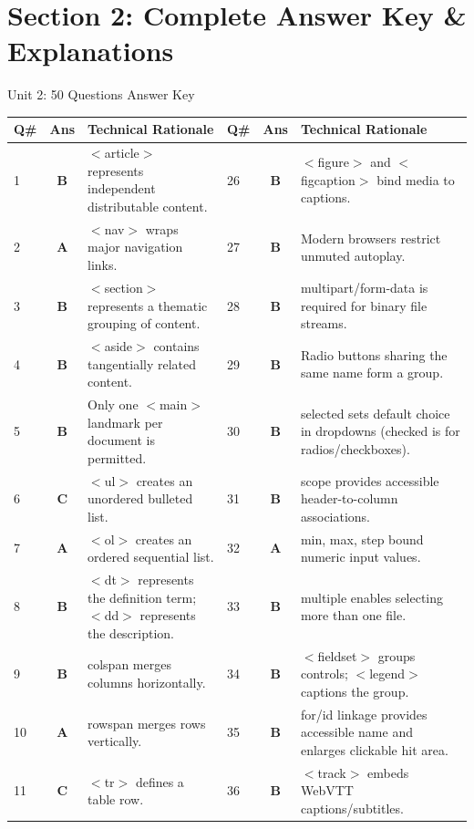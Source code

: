 \newpage
\section{Section 2: Complete Answer Key \& Explanations}

\begin{answerkeytable}{Unit 2: 50 Questions Answer Key}
\begin{tabularx}{\textwidth}{l c X l c X}
\toprule
\textbf{Q\#} & \textbf{Ans} & \textbf{Technical Rationale} & \textbf{Q\#} & \textbf{Ans} & \textbf{Technical Rationale} \\
\midrule
1 & \textbf{B} & $<$article$>$ represents independent distributable content. & 26 & \textbf{B} & $<$figure$>$ and $<$figcaption$>$ bind media to captions. \\
2 & \textbf{A} & $<$nav$>$ wraps major navigation links. & 27 & \textbf{B} & Modern browsers restrict unmuted autoplay. \\
3 & \textbf{B} & $<$section$>$ represents a thematic grouping of content. & 28 & \textbf{B} & multipart/form-data is required for binary file streams. \\
4 & \textbf{B} & $<$aside$>$ contains tangentially related content. & 29 & \textbf{B} & Radio buttons sharing the same name form a group. \\
5 & \textbf{B} & Only one $<$main$>$ landmark per document is permitted. & 30 & \textbf{B} & selected sets default choice in dropdowns (checked is for radios/checkboxes). \\
6 & \textbf{C} & $<$ul$>$ creates an unordered bulleted list. & 31 & \textbf{B} & scope provides accessible header-to-column associations. \\
7 & \textbf{A} & $<$ol$>$ creates an ordered sequential list. & 32 & \textbf{A} & min, max, step bound numeric input values. \\
8 & \textbf{B} & $<$dt$>$ represents the definition term; $<$dd$>$ represents the description. & 33 & \textbf{B} & multiple enables selecting more than one file. \\
9 & \textbf{B} & colspan merges columns horizontally. & 34 & \textbf{B} & $<$fieldset$>$ groups controls; $<$legend$>$ captions the group. \\
10 & \textbf{A} & rowspan merges rows vertically. & 35 & \textbf{B} & for/id linkage provides accessible name and enlarges clickable hit area. \\
11 & \textbf{C} & $<$tr$>$ defines a table row. & 36 & \textbf{B} & $<$track$>$ embeds WebVTT captions/subtitles. \\

\end{tabularx}
\end{answerkeytable}
